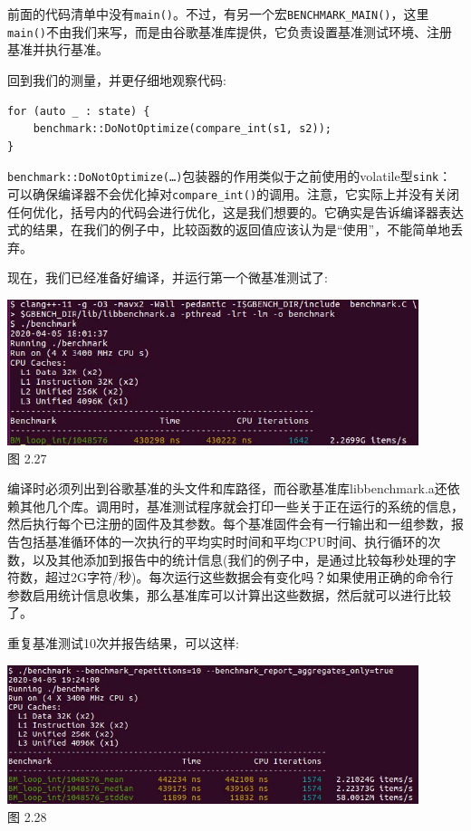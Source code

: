前面的代码清单中没有\texttt{main()}。不过，有另一个宏\texttt{BENCHMARK\_MAIN()}，这里\texttt{main()}不由我们来写，而是由谷歌基准库提供，它负责设置基准测试环境、注册基准并执行基准。

回到我们的测量，并更仔细地观察代码:

\begin{lstlisting}[style=styleCXX]
for (auto _ : state) {
	benchmark::DoNotOptimize(compare_int(s1, s2));
}
\end{lstlisting}

\texttt{benchmark::DoNotOptimize(…)}包装器的作用类似于之前使用的volatile型\texttt{sink}：可以确保编译器不会优化掉对\texttt{compare\_int()}的调用。注意，它实际上并没有关闭任何优化，括号内的代码会进行优化，这是我们想要的。它确实是告诉编译器表达式的结果，在我们的例子中，比较函数的返回值应该认为是“使用”，不能简单地丢弃。

现在，我们已经准备好编译，并运行第一个微基准测试了:

\begin{center}
\includegraphics[width=0.9\textwidth]{content/1/chapter2/images/27.jpg}\\
图 2.27
\end{center}

编译时必须列出到谷歌基准的头文件和库路径，而谷歌基准库libbenchmark.a还依赖其他几个库。调用时，基准测试程序就会打印一些关于正在运行的系统的信息，然后执行每个已注册的固件及其参数。每个基准固件会有一行输出和一组参数，报告包括基准循环体的一次执行的平均实时时间和平均CPU时间、执行循环的次数，以及其他添加到报告中的统计信息(我们的例子中，是通过比较每秒处理的字符数，超过2G字符/秒)。每次运行这些数据会有变化吗？如果使用正确的命令行参数启用统计信息收集，那么基准库可以计算出这些数据，然后就可以进行比较了。

重复基准测试10次并报告结果，可以这样:

\begin{center}
\includegraphics[width=0.9\textwidth]{content/1/chapter2/images/28.jpg}\\
图 2.28
\end{center}

